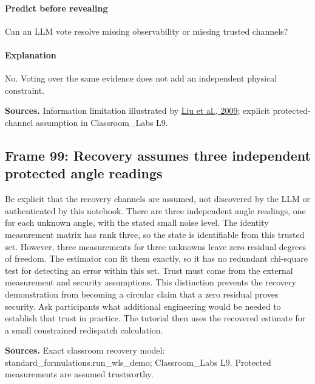 \documentclass[11pt]{article}
\begin{document}
\paragraph{Predict before revealing}Can an LLM vote resolve missing observability or missing trusted channels?
\paragraph{Explanation}No. Voting over the same evidence does not add an independent physical constraint.
\par\nopagebreak\begin{minipage}{\linewidth}{\footnotesize\color{slate}\textbf{Sources.} Information limitation illustrated by \href{https://doi.org/10.1145/1653662.1653666}{Liu et al., 2009}; explicit protected-channel assumption in Classroom\_Labs L9.\par}\end{minipage}\par\medskip
\subsection*{Frame 99: Recovery assumes three independent protected angle readings}
Be explicit that the recovery channels are assumed, not discovered by the LLM or authenticated by this notebook. There are three independent angle readings, one for each unknown angle, with the stated small noise level. The identity measurement matrix has rank three, so the state is identifiable from this trusted set. However, three measurements for three unknowns leave zero residual degrees of freedom. The estimator can fit them exactly, so it has no redundant chi-square test for detecting an error within this set. Trust must come from the external measurement and security assumptions. This distinction prevents the recovery demonstration from becoming a circular claim that a zero residual proves security. Ask participants what additional engineering would be needed to establish that trust in practice. The tutorial then uses the recovered estimate for a small constrained redispatch calculation.\par
\par\nopagebreak\begin{minipage}{\linewidth}{\footnotesize\color{slate}\textbf{Sources.} Exact classroom recovery model: standard\_formulations.run\_wls\_demo; Classroom\_Labs L9. Protected measurements are assumed trustworthy.\par}\end{minipage}\par\medskip
\end{document}
